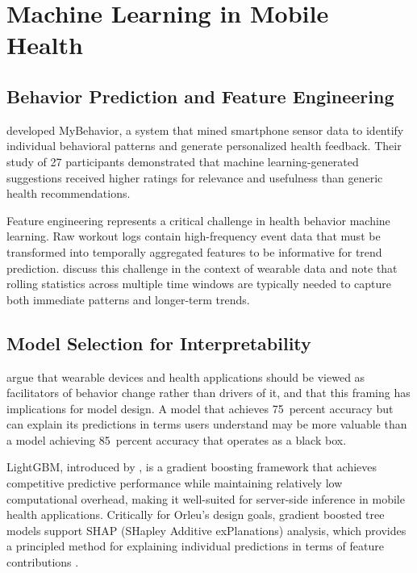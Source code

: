 \documentclass[12pt, a4paper]{report}
\begin{document}
\section{Machine Learning in Mobile Health}

\subsection{Behavior Prediction and Feature Engineering}

\citet{rabbi2015} developed MyBehavior, a system that mined smartphone sensor data to identify individual behavioral patterns and generate personalized health feedback. Their study of 27 participants demonstrated that machine learning-generated suggestions received higher ratings for relevance and usefulness than generic health recommendations.

Feature engineering represents a critical challenge in health behavior machine learning. Raw workout logs contain high-frequency event data that must be transformed into temporally aggregated features to be informative for trend prediction. \citet{rawassizadeh2014} discuss this challenge in the context of wearable data and note that rolling statistics across multiple time windows are typically needed to capture both immediate patterns and longer-term trends.

\subsection{Model Selection for Interpretability}

\citet{patel2015} argue that wearable devices and health applications should be viewed as facilitators of behavior change rather than drivers of it, and that this framing has implications for model design. A model that achieves 75~percent accuracy but can explain its predictions in terms users understand may be more valuable than a model achieving 85~percent accuracy that operates as a black box.

LightGBM, introduced by \citet{ke2017}, is a gradient boosting framework that achieves competitive predictive performance while maintaining relatively low computational overhead, making it well-suited for server-side inference in mobile health applications. Critically for Orleu's design goals, gradient boosted tree models support SHAP (SHapley Additive exPlanations) analysis, which provides a principled method for explaining individual predictions in terms of feature contributions \citep{lundberg2017}.
\end{document}
